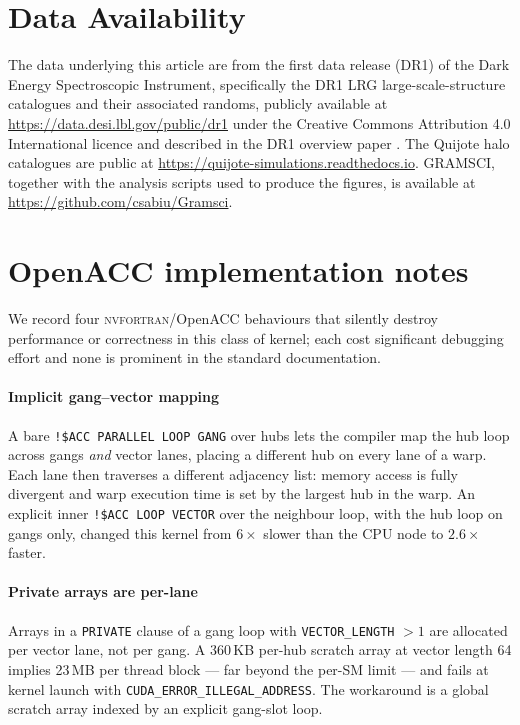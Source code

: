 \documentclass[twocolumn]{aastex701}
\begin{document}
\section*{Data Availability}

The data underlying this article are from the first data release (DR1) of
the Dark Energy Spectroscopic Instrument, specifically the DR1 LRG
large-scale-structure catalogues and their associated randoms, publicly
available at \url{https://data.desi.lbl.gov/public/dr1} under the Creative
Commons Attribution 4.0 International licence and described in the DR1
overview paper \citep{desidr1}.  The Quijote halo catalogues
\citep{villaescusa20} are public at
\url{https://quijote-simulations.readthedocs.io}.  GRAMSCI, together with
the analysis scripts used to produce the figures, is available at
\url{https://github.com/csabiu/Gramsci}.

\appendix

\section{OpenACC implementation notes}
\label{app:openacc}

We record four \textsc{nvfortran}/OpenACC behaviours that silently destroy
performance or correctness in this class of kernel; each cost significant
debugging effort and none is prominent in the standard documentation.

\paragraph{Implicit gang--vector mapping}
A bare \texttt{!\$ACC PARALLEL LOOP GANG} over hubs lets the compiler map
the hub loop across gangs \emph{and} vector lanes, placing a different hub
on every lane of a warp.  Each lane then traverses a different adjacency
list: memory access is fully divergent and warp execution time is set by
the largest hub in the warp.  An explicit inner \texttt{!\$ACC LOOP
VECTOR} over the neighbour loop, with the hub loop on gangs only, changed
this kernel from $6\times$ slower than the CPU node to $2.6\times$ faster.

\paragraph{Private arrays are per-lane}
Arrays in a \texttt{PRIVATE} clause of a gang loop with
\texttt{VECTOR\_LENGTH} $> 1$ are allocated per vector lane, not per gang.
A 360\,KB per-hub scratch array at vector length 64 implies 23\,MB per
thread block --- far beyond the per-SM limit --- and fails at kernel launch
with \texttt{CUDA\_ERROR\_ILLEGAL\_ADDRESS}.  The workaround is a global
scratch array indexed by an explicit gang-slot loop.
\end{document}
